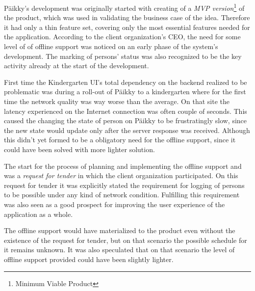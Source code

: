 
Päikky's development was originally started with creating of a \textit{MVP version}\footnote{Minimum Viable Product} of the product, which was used in validating the business case of the idea. Therefore it had only a thin feature set, covering only the most essential features needed for the application. According to the client organization's CEO, the need for some level of of offline support was noticed on an early phase of the system's development. The marking of persons' status was also recognized to be the key activity already at the start of the development.

First time the Kindergarten UI's total dependency on the backend realized to be problematic was during a roll-out of Päikky to a kindergarten where for the first time the network quality was way worse than the average. On that site the latency experienced on the Internet connection was often couple of seconds. This caused the changing the state of person on Päikky to be frustratingly slow, since the new state would update only after the server response was received. Although this didn't yet formed to be a obligatory need for the offline support, since it could have been solved with more lighter solution.

The start for the process of planning and implementing the offline support and was a \textit{request for tender} in which the client organization participated. On this request for tender it was explicitly stated the requirement for logging of persons to be possible under any kind of network condition. Fulfilling this requirement was also seen as a good prospect for improving the user experience of the application as a whole.

The offline support would have materialized to the product even without the existence of the request for tender, but on that scenario the possible schedule for it remains unknown. It was also speculated that on that scenario the level of offline support provided could have been slightly lighter.

















